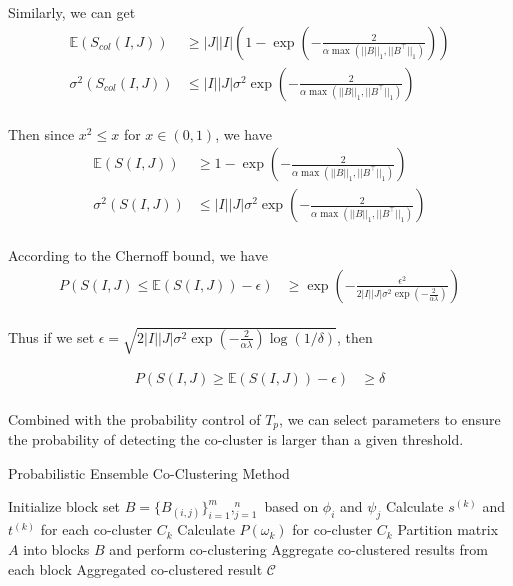 Similarly, we can get
\begin{align*}
    \mathbb{E}(S_{col}(I,J)) & \ge |J||I| \left(1 - \exp(-\frac{2}{\alpha \max(||B||_1, ||B^\top||_1)}) \right) \\
    \sigma^2(S_{col}(I,J))   & \le |I||J| \sigma^2 \exp(-\frac{2}{\alpha \max(||B||_1, ||B^\top||_1)})          \\
\end{align*}

Then since $x^2 \le x$ for $x \in (0,1)$, we have
\begin{align*}
    \mathbb{E}(S(I,J)) & \ge 1 - \exp(-\frac{2}{\alpha \max(||B||_1, ||B^\top||_1)})             \\
    \sigma^2(S(I,J))   & \le |I||J| \sigma^2 \exp(-\frac{2}{\alpha \max(||B||_1, ||B^\top||_1)}) \\
\end{align*}

According to the Chernoff bound, we have
\begin{align*}
    P(S(I,J) \le \mathbb{E}(S(I,J)) - \epsilon)
     & \ge \exp(-\frac{\epsilon^2}{2|I||J| \sigma^2 \exp(-\frac{2}{\alpha \lambda})}) \\
\end{align*}

Thus if we set $\epsilon = \sqrt{2|I||J| \sigma^2 \exp(-\frac{2}{\alpha \lambda}) \log(1/\delta)}$, then

\begin{align*}
    P(S(I,J) \ge \mathbb{E}(S(I,J)) - \epsilon) & \ge \delta \\
\end{align*}

Combined with the probability control of $T_p$, we can select parameters to ensure the probability of detecting the co-cluster is larger than a given threshold.

\begin{algorithm}[!t]
    \caption{Probabilistic Ensemble Co-Clustering Method}\label{alg:method}
    \begin{algorithmic}[1]
        \STATE Initialize block set $B = \{B_{(i,j)}\}_{i=1}^m,_{j=1}^n$ based on $\phi_i$ and $\psi_j$
        \STATE Calculate $s^{(k)}$ and $t^{(k)}$ for each co-cluster $C_k$
            \STATE Calculate $P(\omega_k)$ for co-cluster $C_k$
                \STATE Partition matrix $A$ into blocks $B$ and perform co-clustering
                \STATE Aggregate co-clustered results from each block
            \ENDIF
        \ENDFOR
        \RETURN Aggregated co-clustered result $\mathcal{C}$
    \end{algorithmic}
\end{algorithm}